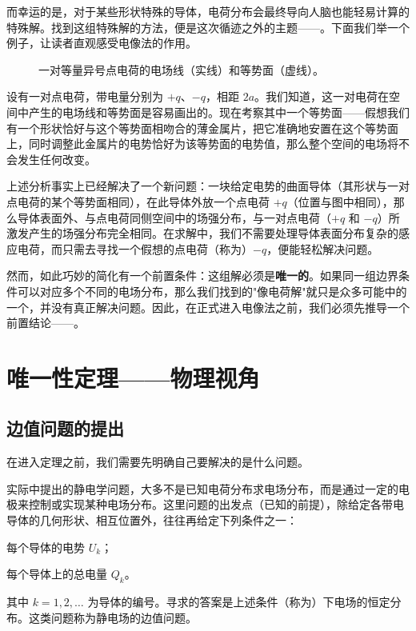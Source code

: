 而幸运的是，对于某些形状特殊的导体，电荷分布会最终导向人脑也能轻易计算的特殊解。找到这组特殊解的方法，便是这次循迹之外的主题——。下面我们举一个例子，让读者直观感受电像法的作用。

\begin{figure}
    \centering
    \caption{一对等量异号点电荷的电场线（实线）和等势面（虚线）。}
\end{figure}

设有一对点电荷，带电量分别为 $+q$、$-q$，相距 $2a$。我们知道，这一对电荷在空间中产生的电场线和等势面是容易画出的。现在考察其中一个等势面——假想我们有一个形状恰好与这个等势面相吻合的薄金属片，把它准确地安置在这个等势面上，同时调整此金属片的电势恰好为该等势面的电势值，那么整个空间的电场将不会发生任何改变。

上述分析事实上已经解决了一个新问题：一块给定电势的曲面导体（其形状与一对点电荷的某个等势面相同），在此导体外放一个点电荷 $+q$（位置与图中相同），那么导体表面外、与点电荷同侧空间中的场强分布，与一对点电荷（$+q$ 和 $-q$）所激发产生的场强分布完全相同。在求解中，我们不需要处理导体表面分布复杂的感应电荷，而只需去寻找一个假想的点电荷（称为）$-q$，便能轻松解决问题。

然而，如此巧妙的简化有一个前置条件：这组解必须是\textbf{唯一的}。如果同一组边界条件可以对应多个不同的电场分布，那么我们找到的"像电荷解"就只是众多可能中的一个，并没有真正解决问题。因此，在正式进入电像法之前，我们必须先推导一个前置结论——。


\section{唯一性定理——物理视角}

\subsection{边值问题的提出}

在进入定理之前，我们需要先明确自己要解决的是什么问题。

实际中提出的静电学问题，大多不是已知电荷分布求电场分布，而是通过一定的电极来控制或实现某种电场分布。这里问题的出发点（已知的前提），除给定各带电导体的几何形状、相互位置外，往往再给定下列条件之一：
\begin{Itemize}
    \item 每个导体的电势 $U_k$；
    \item 每个导体上的总电量 $Q_k$。
\end{Itemize}
其中 $k = 1, 2, \ldots$ 为导体的编号。寻求的答案是上述条件（称为）下电场的恒定分布。这类问题称为静电场的边值问题。

